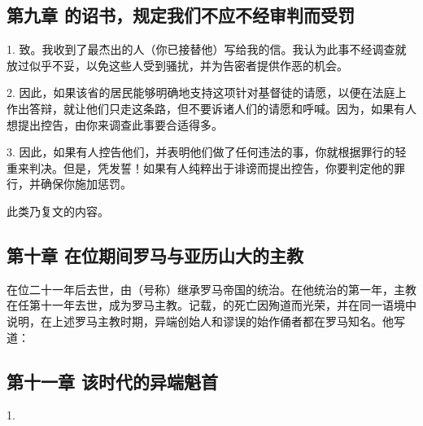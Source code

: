 
\subsection{第九章 的诏书，规定我们不应不经审判而受罚}

1. 致。我收到了最杰出的人（你已接替他）写给我的信。我认为此事不经调查就放过似乎不妥，以免这些人受到骚扰，并为告密者提供作恶的机会。\par

2. 因此，如果该省的居民能够明确地支持这项针对基督徒的请愿，以便在法庭上作出答辩，就让他们只走这条路，但不要诉诸人们的请愿和呼喊。因为，如果有人想提出控告，由你来调查此事要合适得多。\par

3. 因此，如果有人控告他们，并表明他们做了任何违法的事，你就根据罪行的轻重来判决。但是，凭发誓！如果有人纯粹出于诽谤而提出控告，你要判定他的罪行，并确保你施加惩罚。\par

此类乃复文的内容。\par


\subsection{第十章 在位期间罗马与亚历山大的主教}

在位二十一年后去世，由（号称）继承罗马帝国的统治。在他统治的第一年，主教在任第十一年去世，成为罗马主教。记载，的死亡因殉道而光荣，并在同一语境中说明，在上述罗马主教时期，异端创始人和谬误的始作俑者都在罗马知名。他写道：\par


\subsection{第十一章 该时代的异端魁首}

1. \par

